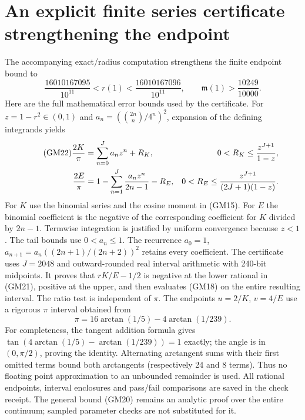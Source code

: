 \section{An explicit finite series certificate strengthening the endpoint}
The accompanying exact/radius computation strengthens the finite endpoint
bound to
\begin{equation}\tag{GM21}
 \frac{16010167095}{10^{11}}<r(1)<\frac{16010167096}{10^{11}},
 \qquad \boxed{\mathfrak m(1)>\frac{10249}{10000}.}
\end{equation}
Here are the full mathematical error bounds used by the certificate.
For $z=1-r^2\in(0,1)$ and
$a_n=(\binom{2n}n/4^n)^2$, expansion of the defining integrands yields
\begin{align}\tag{GM22}
 \frac{2K}{\pi}&=\sum_{n=0}^{J}a_nz^n+R_K,
 &0<R_K\le\frac{z^{J+1}}{1-z},\notag\\
 \frac{2E}{\pi}&=1-\sum_{n=1}^{J}\frac{a_nz^n}{2n-1}-R_E,
 &0<R_E\le\frac{z^{J+1}}{(2J+1)(1-z)}.\notag
\end{align}
For $K$ use the binomial series and the cosine moment in (GM15).
For $E$ the binomial coefficient is the negative of the corresponding
coefficient for $K$ divided by $2n-1$. Termwise integration is justified
by uniform convergence because $z<1$. The tail bounds use $0<a_n\le1$.
The recurrence $a_0=1$, $a_{n+1}=a_n((2n+1)/(2n+2))^2$ retains every
coefficient. The certificate uses $J=2048$ and outward-rounded real
interval arithmetic with 240-bit midpoints. It proves that $rK/E-1/2$
is negative at the lower rational in (GM21), positive at the upper,
and then evaluates (GM18) on the entire resulting interval.
The ratio test is independent of $\pi$. The endpoints $u=2/K$,
$v=4/E$ use a rigorous $\pi$ interval obtained from
\[
 \pi=16\arctan(1/5)-4\arctan(1/239).
\]
For completeness, the tangent addition formula gives
$\tan(4\arctan(1/5)-\arctan(1/239))=1$ exactly;
the angle is in $(0,\pi/2)$, proving the identity.
Alternating arctangent sums with their first omitted terms bound both
arctangents (respectively 24 and 8 terms). Thus no floating point
approximation to an unbounded remainder is used. All rational endpoints,
interval enclosures and pass/fail comparisons are saved in the check
receipt. The general bound (GM20) remains an analytic proof over the
entire continuum; sampled parameter checks are not substituted for it.

